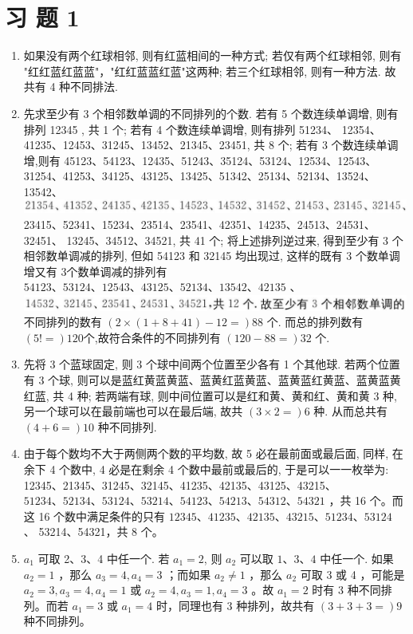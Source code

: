 \documentclass[10pt]{article}
\begin{document}
\section{习 题 1}
\begin{enumerate}
  \item 如果没有两个红球相邻, 则有红蓝相间的一种方式; 若仅有两个红球相邻, 则有 "红红蓝红蓝蓝"，"红红蓝蓝红蓝"这两种; 若三个红球相邻, 则有一种方法. 故共有 4 种不同排法.
  \item 先求至少有 3 个相邻数单调的不同排列的个数. 若有 5 个数连续单调增, 则有排列 12345 , 共 1 个; 若有 4 个数连续单调增, 则有排列 51234、 12354、41235、12453、31245、13452、21345、23451, 共 8 个; 若有 3 个数连续单调增,则有 45123、54123、12435、51243、35124、53124、12534、12543、 31254、41253、34125、43125、13425、51342、25134、52134、13524、13542、\\
\includegraphics[max width=\textwidth]{2024_10_09_bce9f07034ef55fc9c97g-72} 23415、52341、15234、23514、23541、42351、14235、24513、24531、32451、 13245、34512、34521, 共 41 个; 将上述排列逆过来, 得到至少有 3 个相邻数单调减的排列, 但如 54123 和 32145 均出现过, 这样的既有 3 个数单调增又有 3个数单调减的排列有 $54123 、 53124 、 12543 、 43125 、 52134 、 13542 、 42135$ 、\\
\includegraphics[max width=\textwidth]{2024_10_09_bce9f07034ef55fc9c97g-72(1)}不同排列的数有 $(2 \times(1+8+41)-12=) 88$ 个. 而总的排列数有 $(5!=) 120$个,故符合条件的不同排列有 $(120-88=) 32$ 个.
  \item 先将 3 个蓝球固定, 则 3 个球中间两个位置至少各有 1 个其他球. 若两个位置有 3 个球, 则可以是蓝红黄蓝黄蓝、蓝黄红蓝黄蓝、蓝黄蓝红黄蓝、蓝黄蓝黄红蓝, 共 4 种; 若两端有球, 则中间位置可以是红和黄、黄和红、黄和黄 3 种, 另一个球可以在最前端也可以在最后端, 故共 $(3 \times 2=) 6$ 种. 从而总共有 $(4+6=) 10$ 种不同排列.
  \item 由于每个数均不大于两侧两个数的平均数, 故 5 必在最前面或最后面, 同样, 在余下 4 个数中, 4 必是在剩余 4 个数中最前或最后的, 于是可以一一枚举为: 12345、21345、31245、32145、41235、42135、43125、43215、\\
$51234 、 52134 、 53124 、 53214 、 54123 、 54213 、 54312 、 54321$ ，共 16 个。而这 16 个数中满足条件的只有 $12345 、 41235 、 42135 、 43215 、 51234 、 53124$ 、 53214、54321，共 8 个。
  \item $a_{1}$ 可取 2、3、4 中任一个. 若 $a_{1}=2$, 则 $a_{2}$ 可以取 $1 、 3 、 4$ 中任一个. 如果 $a_{2}=1$ ，那么 $a_{3}=4, a_{4}=3$ ；而如果 $a_{2} \neq 1$ ，那么 $a_{2}$ 可取 3 或 4 ，可能是 $a_{2}=3, a_{3}=4, a_{4}=1$ 或 $a_{2}=4, a_{3}=1, a_{4}=3$ 。故 $a_{1}=2$ 时有 3 种不同排列。而若 $a_{1}=3$ 或 $a_{1}=4$ 时，同理也有 3 种排列，故共有 $(3+3+3=) 9$ 种不同排列。

\end{enumerate}
\end{document}
